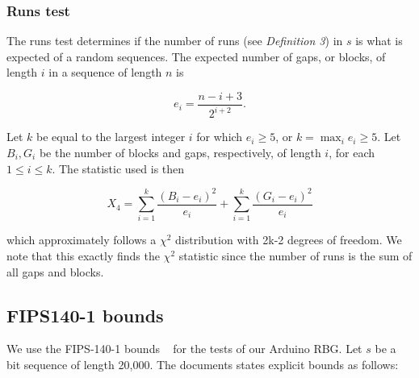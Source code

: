 \documentclass[a4paper]{article}           %
\begin{document}
\subsubsection{Runs test}

The runs test determines if the number of runs (see \textit{Definition 3}) in $s$ is what is expected of a random sequences. The expected number of gaps, or blocks, of length $i$ in a sequence of length $n$ is

\[
e_i = \frac{n-i+3}{2^{i+2}}.
\]

Let $k$ be equal to the largest integer $i$ for which $e_i \geq 5$, or $k = \max_i e_i \geq 5$. Let $B_i, G_i$ be the number of blocks and gaps, respectively, of length $i$, for each $ 1 \leq i \leq k$. The statistic used is then

\begin{equation}
X_4 = \sum_{i=1}^k \frac{(B_i - e_i)^2}{e_i} + \sum_{i=1}^k \frac{(G_i - e_i)^2}{e_i}
\end{equation}

which approximately follows a $\chi^2$ distribution with 2k-2 degrees of freedom. We note that this exactly finds the $\chi^2$ statistic since the number of runs is the sum of all gaps and blocks. 

\subsection{FIPS140-1 bounds}

We use the FIPS-140-1 bounds ~\cite{fips140} for the tests of our Arduino RBG. Let $s$ be a bit sequence of length 20,000. The documents states explicit bounds as follows:
\end{document}
